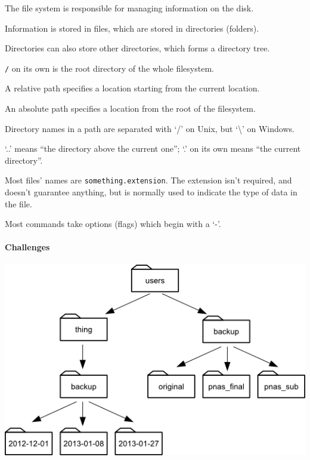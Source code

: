 \documentclass{book}
\begin{document}
\begin{keypoints}
\begin{swcitemize}
\item
  The file system is responsible for managing information on the disk.
\item
  Information is stored in files, which are stored in directories
  (folders).
\item
  Directories can also store other directories, which forms a directory
  tree.
\item
  \texttt{/} on its own is the root directory of the whole filesystem.
\item
  A relative path specifies a location starting from the current
  location.
\item
  An absolute path specifies a location from the root of the filesystem.
\item
  Directory names in a path are separated with `/' on Unix, but
  `\textbackslash{}' on Windows.
\item
  `..' means ``the directory above the current one''; `.' on its own
  means ``the current directory''.
\item
  Most files' names are \texttt{something.extension}. The extension
  isn't required, and doesn't guarantee anything, but is normally used
  to indicate the type of data in the file.
\item
  Most commands take options (flags) which begin with a `-'.
\end{swcitemize}
\end{keypoints}

\mbox{}\paragraph{Challenges}

\includegraphics{novice/shell/img/filesystem-challenge.png}
\end{document}
